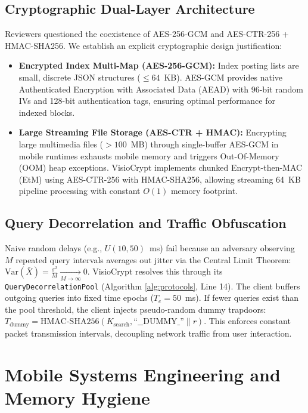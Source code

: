 \documentclass[10pt,conference]{IEEEtran}
\begin{document}
\subsection{Cryptographic Dual-Layer Architecture}
Reviewers questioned the coexistence of AES-256-GCM and AES-CTR-256 + HMAC-SHA256. We establish an explicit cryptographic design justification:
\begin{itemize}
    \item \textbf{Encrypted Index Multi-Map (AES-256-GCM):} Index posting lists are small, discrete JSON structures ($\le 64$~KB). AES-GCM provides native Authenticated Encryption with Associated Data (AEAD) with 96-bit random IVs and 128-bit authentication tags, ensuring optimal performance for indexed blocks.
    \item \textbf{Large Streaming File Storage (AES-CTR + HMAC):} Encrypting large multimedia files ($> 100$~MB) through single-buffer AES-GCM in mobile runtimes exhausts mobile memory and triggers Out-Of-Memory (OOM) heap exceptions. VisioCrypt implements chunked Encrypt-then-MAC (EtM) using AES-CTR-256 with HMAC-SHA256, allowing streaming 64~KB pipeline processing with constant $O(1)$ memory footprint.
\end{itemize}



\subsection{Query Decorrelation and Traffic Obfuscation}
Naive random delays (e.g., $U(10, 50)$~ms) fail because an adversary observing $M$ repeated query intervals averages out jitter via the Central Limit Theorem: $\text{Var}(\bar{X}) = \frac{\sigma^2}{M} \xrightarrow[M \to \infty]{} 0$. VisioCrypt resolves this through its \texttt{QueryDecorrelationPool} (Algorithm \ref{alg:protocols}, Line 14). The client buffers outgoing queries into fixed time epochs ($T_e = 50$~ms). If fewer queries exist than the pool threshold, the client injects pseudo-random dummy trapdoors: $T_{\text{dummy}} = \text{HMAC-SHA256}(K_{\text{search}}, \text{``\_\_DUMMY\_''}\parallel r)$. This enforces constant packet transmission intervals, decoupling network traffic from user interaction.

\section{Mobile Systems Engineering and Memory Hygiene}
\enlargethispage{2\baselineskip}
\end{document}

